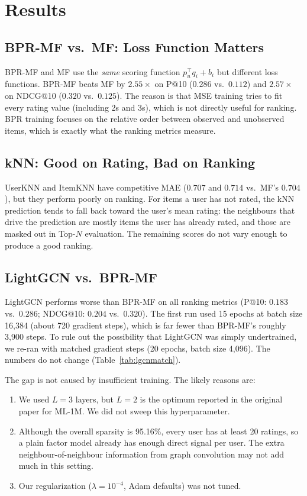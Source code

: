 \documentclass[sigconf,nonacm]{acmart}
\begin{document}
\section{Results}\label{sec:results}



\subsection{BPR-MF vs.\ MF: Loss Function Matters}
BPR-MF and MF use the \emph{same} scoring function $p_u^\top q_i + b_i$
but different loss functions. BPR-MF beats MF by $2.55\times$ on P@10
($0.286$ vs.\ $0.112$) and $2.57\times$ on NDCG@10 ($0.320$ vs.\ $0.125$).
The reason is that MSE training tries to fit every rating value (including
2s and 3s), which is not directly useful for ranking. BPR training focuses
on the relative order between observed and unobserved items, which is
exactly what the ranking metrics measure.

\subsection{kNN: Good on Rating, Bad on Ranking}
UserKNN and ItemKNN have competitive MAE ($0.707$ and $0.714$ vs.\ MF's
$0.704$), but they perform poorly on ranking. For items a user has not
rated, the kNN prediction tends to fall back toward the user's mean
rating: the neighbours that drive the prediction are mostly items the
user has already rated, and those are masked out in Top-$N$ evaluation.
The remaining scores do not vary enough to produce a good ranking.

\subsection{LightGCN vs.\ BPR-MF}
LightGCN performs worse than BPR-MF on all ranking metrics (P@10:
$0.183$ vs.\ $0.286$; NDCG@10: $0.204$ vs.\ $0.320$). The first run
used 15 epochs at batch size 16{,}384 (about 720 gradient steps),
which is far fewer than BPR-MF's roughly 3{,}900 steps. To rule out the
possibility that LightGCN was simply undertrained, we re-ran with
matched gradient steps (20 epochs, batch size 4{,}096). The numbers do
not change (Table~\ref{tab:lgcnmatch}).



The gap is not caused by insufficient training. The likely reasons are:
\begin{enumerate}[leftmargin=*]
\item We used $L = 3$ layers, but $L = 2$ is the optimum reported in the
original paper for ML-1M. We did not sweep this hyperparameter.
\item Although the overall sparsity is 95.16\%, every user has at least 20
ratings, so a plain factor model already has enough direct signal per
user. The extra neighbour-of-neighbour information from graph convolution
may not add much in this setting.
\item Our regularization ($\lambda = 10^{-4}$, Adam defaults) was not tuned.
\end{enumerate}
\end{document}
